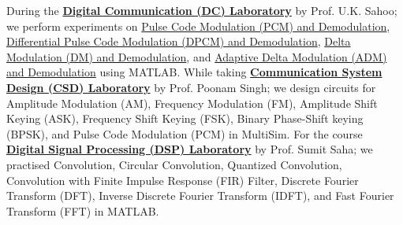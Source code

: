 During the \textbf{\href{https://github.com/nitrece/digital-communication-laboratory}{Digital Communication (DC) Laboratory}} by Prof. U.K. Sahoo; we perform experiments on \href{https://github.com/matlabf/signal-pcm}{Pulse Code Modulation (PCM) and Demodulation}, \href{https://github.com/matlabf/signal-dpcm}{Differential Pulse Code Modulation (DPCM) and Demodulation}, \href{https://github.com/matlabf/signal-dm}{Delta Modulation (DM) and Demodulation}, and \href{https://github.com/matlabf/signal-adm}{Adaptive Delta Modulation (ADM) and Demodulation} using MATLAB. While taking \textbf{\href{https://github.com/nitrece/communication-system-design-laboratory}{Communication System Design (CSD) Laboratory}} by Prof. Poonam Singh; we design circuits for Amplitude Modulation (AM), Frequency Modulation (FM), Amplitude Shift Keying (ASK), Frequency Shift Keying (FSK), Binary Phase-Shift keying (BPSK), and Pulse Code Modulation (PCM) in MultiSim. For the course \textbf{\href{https://github.com/nitrece/digital-signal-processing-laboratory}{Digital Signal Processing (DSP) Laboratory}} by Prof. Sumit Saha; we practised Convolution, Circular Convolution, Quantized Convolution, Convolution with Finite Impulse Response (FIR) Filter, Discrete Fourier Transform (DFT), Inverse Discrete Fourier Transform (IDFT), and Fast Fourier Transform (FFT) in MATLAB.

